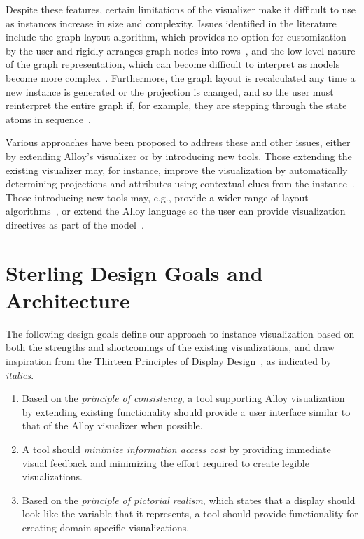 \documentclass[runningheads]{llncs}
\begin{document}
Despite these features, certain limitations of the visualizer make it difficult to use as instances increase in size and complexity. 
Issues identified in the literature include the graph layout algorithm, which provides no option for customization by the user and rigidly arranges graph nodes into rows~\cite{couto2018,macedo2019}, and the low-level nature of the graph representation, which can become difficult to interpret as models become more complex~\cite{gammaitoni2014}. 
Furthermore, the graph layout is recalculated any time a new instance is generated or the projection is changed, and so the user must reinterpret the entire graph if, for example, they are stepping through the state atoms in sequence~\cite{couto2018,misue1995,zaman2013}.


Various approaches have been proposed to address these and other issues, either by extending Alloy's visualizer or by introducing new tools. Those extending the existing visualizer may, for instance, improve the visualization by automatically determining projections and attributes using contextual clues from the instance~\cite{zaman2013}. Those introducing new tools may, e.g., provide a wider range of layout algorithms~\cite{couto2018,macedo2019}, or extend the Alloy language so the user can provide visualization directives as part of the model~\cite{gammaitoni2014}.

\section{Sterling Design Goals and Architecture}
\label{sterling}

The following design goals define our approach to instance visualization based on both the strengths and shortcomings of the existing visualizations, and draw inspiration from the Thirteen Principles of Display Design~\cite{}, as indicated by \emph{italics}.

\begin{enumerate}
    \item \label{dg1} Based on the \emph{principle of consistency}, a tool supporting Alloy visualization by extending existing functionality should provide a user interface similar to that of the Alloy visualizer when possible.
    \item \label{dg2} A tool should \emph{minimize information access cost} by providing immediate visual feedback and minimizing the effort required to create legible visualizations.
    \item \label{dg3} Based on the \emph{principle of pictorial realism}, which states that a display should look like the variable that it represents, a tool should provide functionality for creating domain specific visualizations.
\end{enumerate}
\end{document}
